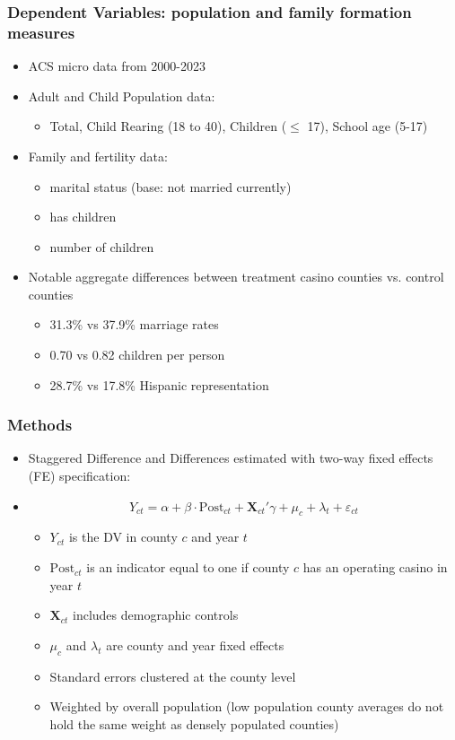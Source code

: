 \documentclass[compress]{beamer}
\begin{document}
\begin{frame} \frametitle{Dependent Variables: population and family formation measures}
	\begin{itemize}
    \item ACS micro data from 2000-2023 
	\item Adult and Child Population data: 
    \begin{itemize}
        \item Total, Child Rearing (18 to 40), Children ($\le$ 17), School age (5-17)
    \end{itemize}
    \item Family and fertility data: 
    \begin{itemize}
        \item marital status (base: not married currently)
        \item has children
        \item number of children
    \end{itemize}
    		\item Notable aggregate differences between treatment casino counties vs. control counties
        \begin{itemize}
            \item 31.3\% vs 37.9\% marriage rates
            \item 0.70 vs 0.82 children per person
            \item 28.7\% vs 17.8\% Hispanic representation
        \end{itemize}
	\end{itemize}
\end{frame}

\begin{frame} \frametitle{Methods}
		\begin{itemize}
	\item Staggered Difference and Differences estimated with two-way fixed effects (FE) specification:
    \item [] \begin{equation}
Y_{ct} = \alpha + \beta \cdot \text{Post}_{ct} + \mathbf{X}_{ct}'\gamma + \mu_c + \lambda_t + \varepsilon_{ct}
\end{equation}
    \begin{itemize}
        \item $Y_{ct}$ is the DV in county $c$ and year $t$ 
        \item $\text{Post}_{ct}$ is an indicator equal to one if county $c$ has an operating casino in year $t$
        \item $\mathbf{X}_{ct}$ includes demographic controls 
        \item $\mu_c$ and $\lambda_t$ are county and year fixed effects
        \item Standard errors clustered at the county level
        \item Weighted by overall population (low population county averages do not hold the same weight as densely populated counties) 
	\end{itemize}
\end{itemize}
\end{frame}
\end{document}
